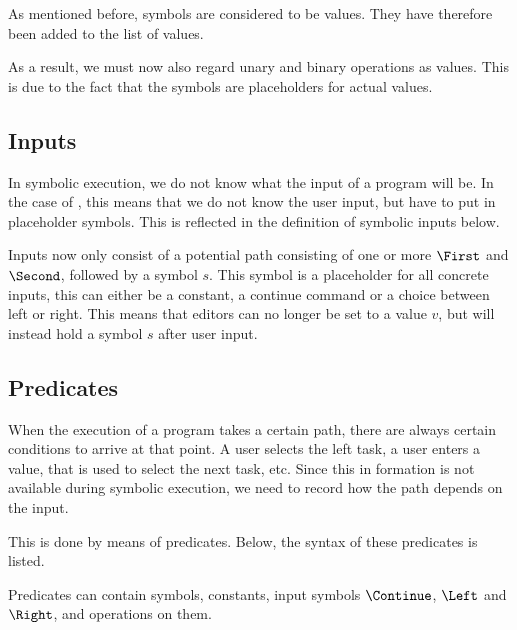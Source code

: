 As mentioned before, symbols are considered to be values.
They have therefore been added to the list of values.


As a result, we must now also regard unary and binary operations as values.
This is due to the fact that the symbols are placeholders for actual values.



\subsection{Inputs}

In symbolic execution, we do not know what the input of a program will be.
In the case of \TOPHAT, this means that we do not know the user input, but have to put in placeholder symbols.
This is reflected in the definition of symbolic inputs below.


Inputs now only consist of a potential path consisting of one or more $\First$ and $\Second$,
followed by a symbol $s$.
This symbol is a placeholder for all concrete inputs, this can either be a constant, a continue command or a choice between left or right.
This means that editors can no longer be set to a value $v$, but will instead hold a symbol $s$ after user input.


\subsection{Predicates}

When the execution of a \TOPHAT program takes a certain path, there are always certain conditions to arrive at that point.
A user selects the left task, a user enters a value, that is used to select the next task, etc.
Since this in formation is not available during symbolic execution, we need to record how the path depends on the input.

This is done by means of predicates.
Below, the syntax of these predicates is listed.


Predicates can contain symbols, constants, input symbols $\Continue$, $\Left$ and $\Right$, and operations on them.
